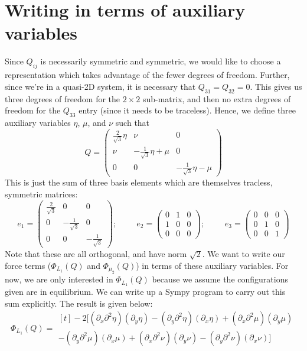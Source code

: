 \documentclass[reqno]{article}
\begin{document}
\section{Writing in terms of auxiliary variables}
Since $Q_{ij}$ is necessarily symmetric and symmetric, we would like to choose a representation which takes advantage of the fewer degrees of freedom.
Further, since we're in a quasi-2D system, it is necessary that $Q_{31} = Q_{32} = 0$. 
This gives us three degrees of freedom for the $2\times 2$ sub-matrix, and then no extra degrees of freedom for the $Q_{33}$ entry (since it needs to be traceless).
Hence, we define three auxiliary variables $\eta$, $\mu$, and $\nu$ such that
\begin{equation}
	Q = 
	\begin{pmatrix}
	\frac{2}{\sqrt3} \eta & \nu & 0\\
	\nu & -\frac{1}{\sqrt3}\eta + \mu & 0 \\
	0 & 0 & -\frac{1}{\sqrt3}\eta - \mu
	\end{pmatrix}
\end{equation}
This is just the sum of three basis elements which are themselves tracless, symmetric matrices:
\begin{equation}
	e_1 = \begin{pmatrix}
	\tfrac{2}{\sqrt3} & 0 & 0 \\
	0 & -\tfrac{1}{\sqrt3} & 0 \\
	0 & 0 & -\tfrac{1}{\sqrt3}
	\end{pmatrix}
	;
	\hspace{1cm}
	e_2 = \begin{pmatrix}
	0 & 1 & 0 \\
	1 & 0 & 0 \\
	0 & 0 & 0
	\end{pmatrix}
	;
	\hspace{1cm}
	e_3 = \begin{pmatrix}
	0 & 0 & 0 \\
	0 & 1 & 0 \\
	0 & 0 & 1
	\end{pmatrix}
\end{equation}
Note that these are all orthogonal, and have norm $\sqrt{2}$.
We want to write our force terms ($\Phi_{L_1} (Q)$ and $\Phi_{\mu_2} (Q)$) in terms of these auxiliary variables.
For now, we are only interested in $\Phi_{L_1}(Q)$ because we assume the configurations given are in equilibrium. 
We can write up a Sympy program to carry out this sum explicitly. 
The result is given below:
\begin{equation}
	\Phi_{L_1} (Q) =
	\begin{multlined}[t]
	-2 \bigl[
	\left( \partial_x \partial^2 \eta \right) \left( \partial_y \eta \right)
	- \left( \partial_y \partial^2 \eta \right) \left( \partial_x \eta \right)
	+ \left(\partial_x \partial^2 \mu \right) \left( \partial_y \mu \right) \\
	- \left( \partial_y \partial^2 \mu \right) \left( \partial_x \mu \right)
	+ \left( \partial_x \partial^2 \nu \right) \left( \partial_y \nu \right)
	- \left( \partial_y \partial^2 \nu \right) \left(\partial_x \nu \right)
	\bigr]
	\end{multlined}
\end{equation}
\end{document}
